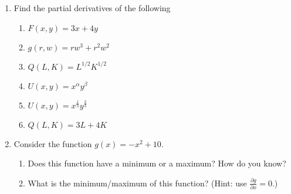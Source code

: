 \documentclass[11pt]{article}
\begin{document}
\begin{enumerate}
  \newpage
  \item Find the partial derivatives of the following
  \begin{multicols}{2}
    \begin{enumerate}
      \item $F(x,y) = 3x + 4y$
      
      \vspace{25mm}
      \item $g(r,w) = rw^3 + r^2w^2$
      
      \vspace{25mm}
      \item $Q(L, K) = L^{1/2} K^{1/2}$

      \vspace{25mm}
      \item $U(x, y) = x^{\alpha} y^\beta$
      
      \vspace{25mm}
      \item $U(x, y) = x^{\frac{1}{3}} y^{\frac{2}{3}}$

      \vspace{25mm}
      \item $Q(L, K) = 3L + 4K$
    \end{enumerate}
  \end{multicols}  
  

  \vspace{40mm}
  \item Consider the function $g(x) = -x^2 + 10$.
  \begin{enumerate}
    \item Does this function have a minimum or a maximum? How do you know?
    
    \item What is the minimum/maximum of this function? (Hint: use $\frac{\partial g}{\partial x} = 0$.)
  \end{enumerate}
\end{enumerate}
\end{document}
